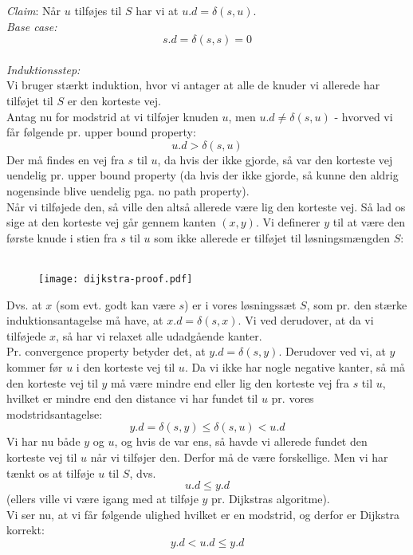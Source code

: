\begin{itemize}
\begin{itemize}
	\textit{Claim}: Når $u$ tilføjes til $S$ har vi at $u.d = \delta(s, u)$.\\
	
	\textit{Base case:}
	$$
	s.d = \delta(s, s) = 0
	$$\\
	
	\textit{Induktionsstep:}\\
	Vi bruger stærkt induktion, hvor vi antager at alle de knuder vi allerede har tilføjet til $S$ er den korteste vej.\\
	Antag nu for modstrid at vi tilføjer knuden $u$, men $u.d \neq \delta(s, u)$ - hvorved vi får følgende pr. upper bound property:
	$$
	u.d > \delta(s, u)
	$$
	Der må findes en vej fra $s$ til $u$, da hvis der ikke gjorde, så var den korteste vej uendelig pr. upper bound property (da hvis der ikke gjorde, så kunne den aldrig nogensinde blive uendelig pga. no path property).\\
	Når vi tilføjede den, så ville den altså allerede være lig den korteste vej. Så lad os sige at den korteste vej går gennem kanten $(x, y)$. Vi definerer $y$ til at være den første knude i stien fra $s$ til $u$ som ikke allerede er tilføjet til løsningsmængden $S$:\\\\
	\begin{figure}[H]
		\begin{center}
			\texttt{[image: dijkstra-proof.pdf]}
		\end{center}
		\label{fig:proof}
	\end{figure}
	Dvs. at $x$ (som evt. godt kan være $s$) er i vores løsningssæt $S$, som pr. den stærke induktionsantagelse må have, at $x.d = \delta(s, x)$. Vi ved derudover, at da vi tilføjede $x$, så har vi relaxet alle udadgående kanter.\\
	Pr. convergence property betyder det, at $y.d = \delta(s, y)$.
	Derudover ved vi, at $y$ kommer før $u$ i den korteste vej til $u$. Da vi ikke har nogle negative kanter, så må den korteste vej til $y$ må være mindre end eller lig den korteste vej fra $s$ til $u$, hvilket er mindre end den distance vi har fundet til $u$ pr. vores modstridsantagelse:
	$$
	y.d = \delta(s, y) \leq \delta(s, u) < u.d
	$$
	Vi har nu både $y$ og $u$, og hvis de var ens, så havde vi allerede fundet den korteste vej til $u$ når vi tilføjer den. Derfor må de være forskellige. Men vi har tænkt os at tilføje $u$ til $S$, dvs.
	$$
	u.d \leq y.d
	$$
	(ellers ville vi være igang med at tilføje $y$ pr. Dijkstras algoritme).\\
	Vi ser nu, at vi får følgende ulighed hvilket er en modstrid, og derfor er Dijkstra korrekt:
	$$
	y.d < u.d \leq y.d
	$$
\end{itemize}



\end{itemize}
